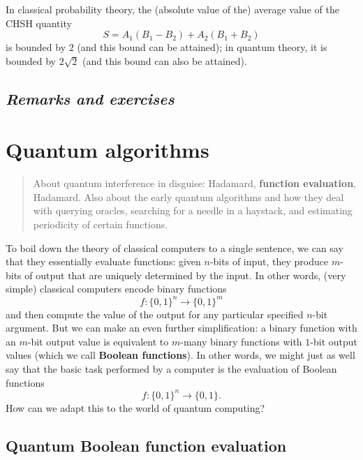 \documentclass[fleqn]{article}
\let\oldsection\section
\renewcommand\section{\clearpage\oldsection}
\begin{document}
In classical probability theory, the (absolute value of the) average value of the CHSH quantity
\[
  S = A_1(B_1 - B_2) + A_2(B_1 + B_2)
\]
is bounded by \(2\) (and this bound can be attained); in quantum theory, it is bounded by \(2\sqrt{2}\) (and this bound can also be attained).

\hypertarget{remarks-and-exercises-EPR-bell}{%
\subsection{\texorpdfstring{\emph{Remarks and exercises}}{Remarks and exercises}}\label{remarks-and-exercises-EPR-bell}}

\hypertarget{quantum-algorithms}{%
\section{Quantum algorithms}\label{quantum-algorithms}}

\begin{quote}
About quantum interference in disguise: Hadamard, \textbf{function evaluation}, Hadamard.
Also about the early quantum algorithms and how they deal with querying oracles, searching for a needle in a haystack, and estimating periodicity of certain functions.
\end{quote}

To boil down the theory of classical computers to a single sentence, we can say that they essentially evaluate functions: given \(n\)-bits of input, they produce \(m\)-bits of output that are uniquely determined by the input.
In other words, (very simple) classical computers encode binary functions
\[
  f\colon \{0,1\}^n \to \{0,1\}^m
\]
and then compute the value of the output for any particular specified \(n\)-bit argument.
But we can make an even further simplification: a binary function with an \(m\)-bit output value is equivalent to \(m\)-many binary functions with \(1\)-bit output values (which we call \textbf{Boolean functions}).
In other words, we might just as well say that the basic task performed by a computer is the evaluation of Boolean functions
\[
  f\colon \{0,1\}^n \to  \{0,1\}.
\]
How can we adapt this to the world of quantum computing?

\hypertarget{quantum-boolean-function-evaluation}{%
\subsection{Quantum Boolean function evaluation}\label{quantum-boolean-function-evaluation}}
\end{document}
